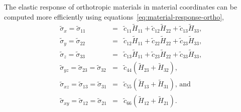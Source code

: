 \documentclass[]             %
{NASA}                       %
\begin{document}
The elastic response of orthotropic materials in material coordinates can be computed more efficiently using equations~\ref{eq:material-response-ortho},
\begin{eqnarray}
\widetilde{\sigma}_{x} = \widetilde{\sigma}_{11} & = & \widetilde{c}_{11}\widetilde{H}_{11} + \widetilde{c}_{12}\widetilde{H}_{22} + \widetilde{c}_{13}\widetilde{H}_{33}\text{,}\label{eq:material-response-ortho}\\
\widetilde{\sigma}_{y} = \widetilde{\sigma}_{22} & = & \widetilde{c}_{12}\widetilde{H}_{11} + \widetilde{c}_{22}\widetilde{H}_{22} + \widetilde{c}_{23}\widetilde{H}_{33}\text{,}\nonumber \\
\widetilde{\sigma}_{z} = \widetilde{\sigma}_{33} & = & \widetilde{c}_{13}\widetilde{H}_{11} + \widetilde{c}_{23}\widetilde{H}_{22} + \widetilde{c}_{33}\widetilde{H}_{33}\text{,}\nonumber \\
\widetilde{\sigma}_{yz} = \widetilde{\sigma}_{23} = \widetilde{\sigma}_{32} & = & \widetilde{c}_{44}(\widetilde{H}_{23} + \widetilde{H}_{32})\text{,}\nonumber \\
\widetilde{\sigma}_{xz} = \widetilde{\sigma}_{13} = \widetilde{\sigma}_{31} & = & \widetilde{c}_{55}(\widetilde{H}_{13} + \widetilde{H}_{31})\text{, and}\nonumber \\
\widetilde{\sigma}_{xy} = \widetilde{\sigma}_{12} = \widetilde{\sigma}_{21} & = & \widetilde{c}_{66}(\widetilde{H}_{12} + \widetilde{H}_{21})\text{.}\nonumber
\end{eqnarray}
\end{document}
